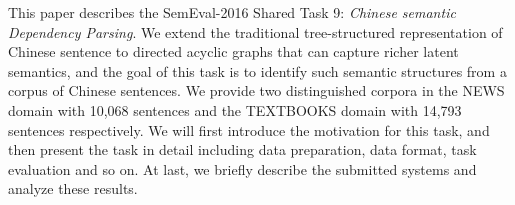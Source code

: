 This paper describes the SemEval-2016 Shared Task 9: \textit{Chinese semantic Dependency Parsing}. We extend the traditional tree-structured representation of Chinese sentence to directed acyclic graphs that can capture richer latent semantics, and the goal of this task is to identify such semantic structures from a corpus of Chinese sentences. We provide two distinguished corpora in the NEWS domain with 10,068 sentences and the TEXTBOOKS domain with 14,793 sentences respectively. We will first introduce the motivation for this task, and then present the task in detail including data preparation, data format, task evaluation and so on. At last, we briefly describe the submitted systems and analyze these results.
